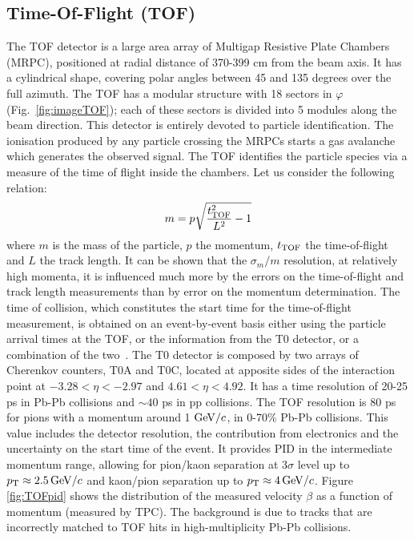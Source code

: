 \subsection{Time-Of-Flight (TOF)}
\label{sec:TOF}
The TOF detector is a large area array of Multigap Resistive Plate Chambers (MRPC), 
positioned at radial distance of 370-399 cm from the beam axis. It has a cylindrical 
shape, covering polar angles between 45 and 135 degrees over the full azimuth. 
The TOF has a modular structure with 18 sectors in $\varphi$ (Fig.~\ref{fig:imageTOF}); each 
of these sectors is divided into 5 modules along the beam direction. 
This detector is entirely devoted to particle identification. 
The ionisation produced by any particle crossing the MRPCs starts a gas avalanche 
which generates the observed signal. The TOF identifies the particle species via a measure of the time of flight 
inside the chambers. Let us consider the following relation:
\[
m = p \sqrt{\frac{t^2_{\rm TOF}}{L^2}-1}
\]
where $m$ is the mass of the particle, $p$ the momentum, $t_{\rm TOF}$ the time-of-flight and 
$L$  the track length. It can be shown that the $\sigma_m/m$ resolution, at relatively high
 momenta, it is influenced much more by the errors on the time-of-flight and track length 
 measurements than by error on the momentum determination.
 The time of collision, which constitutes the start time for the time-of-flight measurement,
 is obtained on an event-by-event basis either using the particle arrival times
 at the TOF, or the information from the T0 detector, or a combination of the two~\cite{Adam:2016ilk}. 
 The T0 detector is composed by two arrays of
Cherenkov counters, T0A and T0C, located at apposite sides of the interaction point at 
$-3.28 < \eta < - 2.97$ and $4.61 < \eta < 4.92$. It has a time resolution of 20-25 ps
 in Pb-Pb collisions and $\sim 40$ ps in pp collisions.
 The TOF resolution is 80 ps for pions with a momentum around 1 $\mathrm{GeV}/c$, in 0-70\% Pb-Pb collisions.
This value includes the detector resolution, the contribution from electronics and the uncertainty
on the start time of the event.
It provides PID in the intermediate momentum range, allowing for pion/kaon separation at 3$\sigma$ level
up to $p_{\rm T} \approx 2.5 \,\mathrm{GeV}/c$  and kaon/pion separation up to $p_{\rm T} \approx 4 \,\mathrm{GeV}/c$.
Figure \ref{fig:TOFpid} shows the distribution of the measured velocity $\beta$ as a function of momentum (measured by TPC). 
The background is due to tracks that are incorrectly matched to TOF hits in high-multiplicity Pb-Pb collisions.
